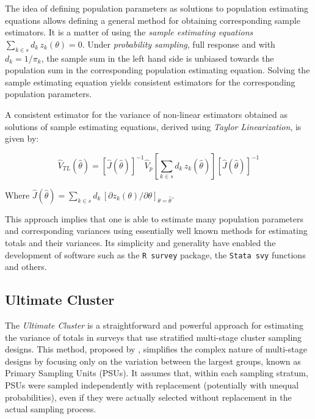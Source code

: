 \documentclass[
  12pt,
]{book}
\begin{document}
The idea of defining population parameters as solutions to population estimating equations allows defining a general method for obtaining corresponding sample estimators. It is a matter of using the \emph{sample estimating equations} \(\sum _{k \in s} d_k \, z_k (\theta) = 0\). Under \emph{probability sampling}, full response and with \(d_k = 1 / \pi_k\), the sample sum in the left hand side is unbiased towards the population sum in the corresponding population estimating equation. Solving the sample estimating equation yields consistent estimators for the corresponding population parameters.

A consistent estimator for the variance of non-linear estimators obtained as solutions of sample estimating equations, derived using \emph{Taylor Linearization}, is given by:

\[
\widehat V_{TL} (\widehat \theta) = \left[ \widehat J ( \widehat \theta) \right] ^{-1} \widehat V_p \left[ \sum _{k \in s} d_k \, z_k (\widehat \theta)\right] \left[ \widehat J ( \widehat \theta) \right] ^{-1}
\]

Where \(\widehat J (\widehat \theta) = \sum _{k \in s} d_k \, \left[ \partial{z_k ( \theta)} / \partial \theta \right]_{\theta = \widehat \theta}\).

This approach implies that one is able to estimate many population parameters and corresponding variances using essentially well known methods for estimating totals and their variances. Its simplicity and generality have enabled the development of software such as the \texttt{R\ survey} package, the \texttt{Stata\ svy} functions and others.

\hypertarget{ultimate-cluster}{%
\subsection{Ultimate Cluster}\label{ultimate-cluster}}

The \emph{Ultimate Cluster} is a straightforward and powerful approach for estimating the variance of totals in surveys that use stratified multi-stage cluster sampling designs. This method, proposed by \citet{Hansen1953}, simplifies the complex nature of multi-stage designs by focusing only on the variation between the largest groups, known as Primary Sampling Units (PSUs). It assumes that, within each sampling stratum, PSUs were sampled independently with replacement (potentially with unequal probabilities), even if they were actually selected without replacement in the actual sampling process.
\end{document}

